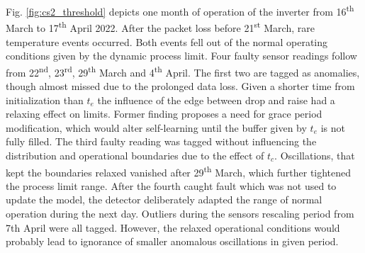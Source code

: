 Fig. \ref{fig:cs2_threshold} depicts one month of operation of the inverter from 16\textsuperscript{th} March to 17\textsuperscript{th} April 2022. After the packet loss before 21\textsuperscript{st} March, rare temperature events occurred. Both events fell out of the normal operating conditions given by the dynamic process limit. Four faulty sensor readings follow from 22\textsuperscript{nd}, 23\textsuperscript{rd}, 29\textsuperscript{th} March and 4\textsuperscript{th} April. The first two are tagged as anomalies, though almost missed due to the prolonged data loss. Given a shorter time from initialization than $t_e$ the influence of the edge between drop and raise had a relaxing effect on limits. Former finding proposes a need for grace period modification, which would alter self-learning until the buffer given by $t_e$ is not fully filled. The third faulty reading was tagged without influencing the distribution and operational boundaries due to the effect of $t_c$. Oscillations, that kept the boundaries relaxed vanished after 29\textsuperscript{th} March, which further tightened the process limit range. After the fourth caught fault which was not used to update the model, the detector deliberately adapted the range of normal operation during the next day. Outliers during the sensors rescaling period from 7th April were all tagged. However, the relaxed operational conditions would probably lead to ignorance of smaller anomalous oscillations in given period.